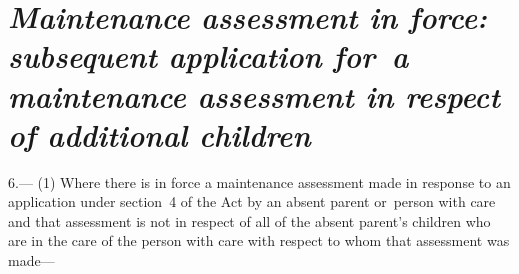 \documentclass[a4paper,12pt]{article}
\begin{document}
\section*{\itshape Maintenance assessment in force: subsequent application for~a maintenance assessment in respect of additional children}

6.—%
%
%
%
%
%
(1) Where there is in force a maintenance assessment made in response to an application under section~4 of the Act by an absent parent or~person with care and that assessment is not in respect of all of the absent parent’s children who are in the care of the person with care with respect to whom that assessment was made—
\end{document}
